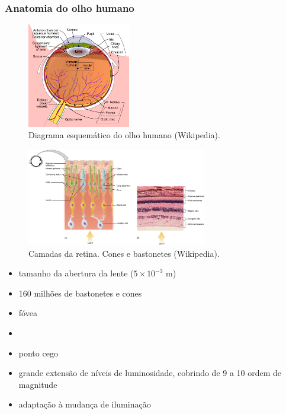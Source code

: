 \begin{frame}[allowframebreaks]
  \frametitle{Anatomia do olho humano}

  \vspace{-2ex} 
  \begin{figure}[h]
  \centering
  \includegraphics[width=0.4\textwidth]{images/schematic_diagram_of_the_human_eye_en.pdf}
  \caption{Diagrama esquemático do olho humano (Wikipedia).}\label{fig-human-eye}
  \end{figure}

  \framebreak

  \begin{figure}[h]
  \centering
  \includegraphics[width=0.7\textwidth]{images/retina.jpg}
  \caption{Camadas da retina. Cones e bastonetes (Wikipedia).}\label{fig-retina}
  \end{figure}

  \framebreak

   \begin{itemize}
   \item tamanho da abertura da lente ($5 \times 10^{-3}$ m)
   \item 160 milhões de bastonetes e cones 
   \item fóvea
   \item {}
   \item ponto cego
   \item grande extensão de níveis de luminosidade, cobrindo de 9 a 10 ordem de magnitude
   \item adaptação à mudança de iluminação
   \end{itemize}
 

\end{frame}
